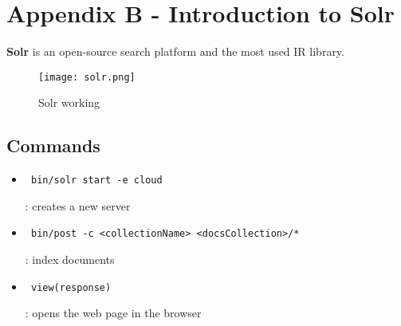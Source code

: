 \documentclass{article}
\begin{document}
\section{Appendix B - Introduction to Solr}
\textbf{Solr} is an open-source search platform and the most used IR library.
\begin{figure}[H]
    \centering
    \texttt{[image: solr.png]}
    \caption{Solr working}
\end{figure}
\subsection{Commands}
\begin{itemize}
    \item
    \begin{verbatim} bin/solr start -e cloud \end{verbatim}: creates a new server
    \item
    \begin{verbatim} bin/post -c <collectionName> <docsCollection>/* \end{verbatim}: index documents
    \item 
    \begin{verbatim} view(response) \end{verbatim}: opens the web page in the browser
\end{itemize}
\end{document}
